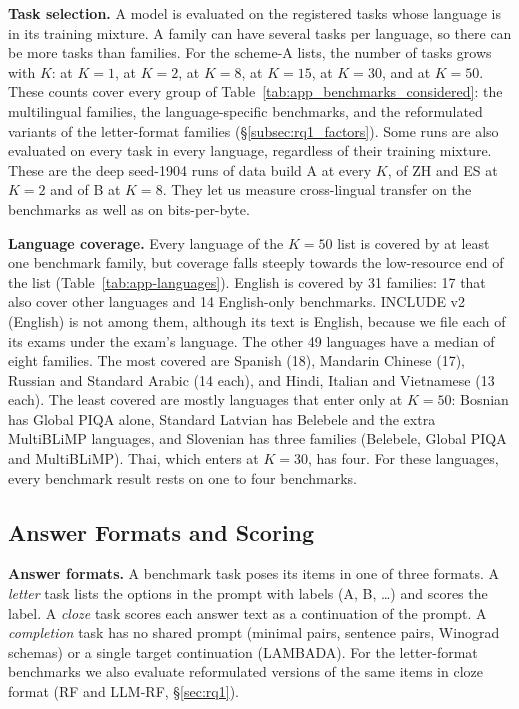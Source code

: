 

\textbf{Task selection.} A model is evaluated on the registered tasks whose language is in its training mixture. A family can have several tasks per language, so there can be more tasks than families. For the scheme-A lists, the number of tasks grows with $K$: \ntasksKone at $K=1$, \ntasksKtwo at $K=2$, \ntasksKeight at $K=8$, \ntasksKfifteen at $K=15$, \ntasksKthirty at $K=30$, and \ntasksKfifty at $K=50$. These counts cover every group of Table~\ref{tab:app_benchmarks_considered}: the multilingual families, the language-specific benchmarks, and the reformulated variants of the letter-format families (\S\ref{subsec:rq1_factors}). Some runs are also evaluated on every task in every language, regardless of their training mixture. These are the deep seed-1904 runs of data build A at every $K$, of ZH and ES at $K=2$ and of B at $K=8$. They let us measure cross-lingual transfer on the benchmarks as well as on bits-per-byte.

\textbf{Language coverage.} Every language of the $K=50$ list is covered by at least one benchmark family, but coverage falls steeply towards the low-resource end of the list (Table~\ref{tab:app-languages}). English is covered by 31 families: 17 that also cover other languages and 14 English-only benchmarks. INCLUDE v2 (English) is not among them, although its text is English, because we file each of its exams under the exam's language. The other 49 languages have a median of eight families. The most covered are Spanish (18), Mandarin Chinese (17), Russian and Standard Arabic (14 each), and Hindi, Italian and Vietnamese (13 each). The least covered are mostly languages that enter only at $K=50$: Bosnian has Global PIQA alone, Standard Latvian has Belebele and the extra MultiBLiMP languages, and Slovenian has three families (Belebele, Global PIQA and MultiBLiMP). Thai, which enters at $K=30$, has four. For these languages, every benchmark result rests on one to four benchmarks.

\subsection{Answer Formats and Scoring}
\label{app:scoring}

\textbf{Answer formats.} A benchmark task poses its items in one of three formats. A \emph{letter} task lists the options in the prompt with labels (A, B, \ldots) and scores the label. A \emph{cloze} task scores each answer text as a continuation of the prompt. A \emph{completion} task has no shared prompt (minimal pairs, sentence pairs, Winograd schemas) or a single target continuation (LAMBADA). For the letter-format benchmarks we also evaluate reformulated versions of the same items in cloze format (RF and LLM-RF, \S\ref{sec:rq1}).

